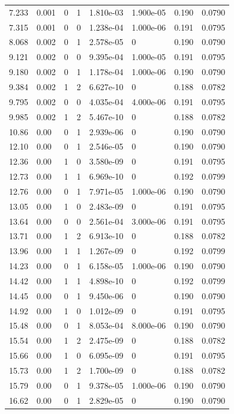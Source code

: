 \documentclass[preview]{standalone}
\begin{document}
{{\begin{tabular}{L{1.2cm}C{1.2cm} C{0.3cm}C{0.5cm} C{1.4cm}C{1.4cm} C{1.4cm}C{1.4cm}}
  7.233  &  0.001  & 0     &  1 &  1.810e-03  & 1.900e-05  & 0.190 &  0.0790   \\ 
  7.315  &  0.001  & 0     &  0 &  1.238e-04  & 1.000e-06  & 0.191 &  0.0795   \\ 
  8.068  &  0.002  & 0     &  1 &  2.578e-05  & 0  & 0.190 &  0.0790   \\ 
  9.121  &  0.002  & 0     &  0 &  9.395e-04  & 1.000e-05  & 0.191 &  0.0795   \\ 
  9.180  &  0.002  & 0     &  1 &  1.178e-04  & 1.000e-06  & 0.190 &  0.0790   \\ 
  9.384  &  0.002  & 1     &  2 &  6.627e-10  & 0  & 0.188 &  0.0782   \\ 
  9.795  &  0.002  & 0     &  0 &  4.035e-04  & 4.000e-06  & 0.191 &  0.0795   \\ 
  9.985  &  0.002  & 1     &  2 &  5.467e-10  & 0  & 0.188 &  0.0782   \\ 
  10.86  &  0.00  & 0     &  1 &  2.939e-06  & 0  & 0.190 &  0.0790   \\ 
  12.10  &  0.00  & 0     &  1 &  2.546e-05  & 0  & 0.190 &  0.0790   \\ 
  12.36  &  0.00  & 1     &  0 &  3.580e-09  & 0  & 0.191 &  0.0795   \\ 
  12.73  &  0.00  & 1     &  1 &  6.969e-10  & 0  & 0.192 &  0.0799   \\ 
  12.76  &  0.00  & 0     &  1 &  7.971e-05  & 1.000e-06  & 0.190 &  0.0790   \\ 
  13.05  &  0.00  & 1     &  0 &  2.483e-09  & 0  & 0.191 &  0.0795   \\ 
  13.64  &  0.00  & 0     &  0 &  2.561e-04  & 3.000e-06  & 0.191 &  0.0795   \\ 
  13.71  &  0.00  & 1     &  2 &  6.913e-10  & 0  & 0.188 &  0.0782   \\ 
  13.96  &  0.00  & 1     &  1 &  1.267e-09  & 0  & 0.192 &  0.0799   \\ 
  14.23  &  0.00  & 0     &  1 &  6.158e-05  & 1.000e-06  & 0.190 &  0.0790   \\ 
  14.42  &  0.00  & 1     &  1 &  4.898e-10  & 0  & 0.192 &  0.0799   \\ 
  14.45  &  0.00  & 0     &  1 &  9.450e-06  & 0  & 0.190 &  0.0790   \\ 
  14.92  &  0.00  & 1     &  0 &  1.012e-09  & 0  & 0.191 &  0.0795   \\ 
  15.48  &  0.00  & 0     &  1 &  8.053e-04  & 8.000e-06  & 0.190 &  0.0790   \\ 
  15.54  &  0.00  & 1     &  2 &  2.475e-09  & 0  & 0.188 &  0.0782   \\ 
  15.66  &  0.00  & 1     &  0 &  6.095e-09  & 0  & 0.191 &  0.0795   \\ 
  15.73  &  0.00  & 1     &  2 &  1.700e-09  & 0  & 0.188 &  0.0782   \\ 
  15.79  &  0.00  & 0     &  1 &  9.378e-05  & 1.000e-06  & 0.190 &  0.0790   \\ 
  16.62  &  0.00  & 0     &  1 &  2.829e-05  & 0  & 0.190 &  0.0790   \\ 
\hline 
\end{tabular} 

}}
\end{document}
